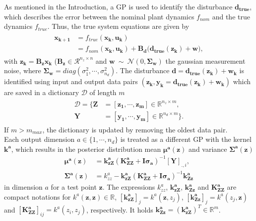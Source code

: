 \documentclass[letterpaper, 10 pt, conference]{ieeeconf}  %
\newcommand{\R}{\mathbb{R}}
\begin{document}
As mentioned in the Introduction, a GP is used to identify the disturbance $\boldsymbol{d_{true}}$, which describes the error between the nominal plant dynamics $f_{nom}$ and the true dynamics $f_{true}$. Thus, the true system equations are given by
\begin{align}
\begin{split}
\boldsymbol{x_{k+1}} &= f_{true}(\boldsymbol{x_k},\boldsymbol{u_k}) \\
        &=  f_{nom}(\boldsymbol{x_k},\boldsymbol{u_k}) + \boldsymbol{B_d}\big(\boldsymbol{d_{true}}(\boldsymbol{z_k})+ \boldsymbol{w}\big),
\end{split}
\end{align}
with $\boldsymbol{z_k} = \boldsymbol{B_z} \boldsymbol{x_k}$ ($\boldsymbol{B_z} \in \mathcal{R}^{n_z \times n}$ and $\boldsymbol{w}~\sim~\mathcal{N}(0,\boldsymbol{\Sigma_w})$  the gaussian measurement noise, where $\boldsymbol{\Sigma_w}= diag(\sigma_1^2, \cdots ,\sigma_{n_d}^2)$.
The disturbance $\boldsymbol{d} = \boldsymbol{d_{true}}(\boldsymbol{z_k}) + \boldsymbol{w_k}$ is identified using input and output data pairs $(\boldsymbol{z_k},\boldsymbol{y_k}=\boldsymbol{d_{true}}(\boldsymbol{z_k})+\boldsymbol{w_k})$ which are saved in a dictionary $\mathcal{D}$ of length $m$
\begin{align}
\begin{split}
\mathcal{D} = \{\boldsymbol{Z} &=[\boldsymbol{z_1}, \cdots, 		\boldsymbol{z_m}] \in \R^{n_z \times m} , \\
                \boldsymbol{Y} &=[\boldsymbol{y_{1}},\cdots,\boldsymbol{y_{m}}]\in \R^{n_d \times m} \}.
\end{split}
\end{align}
If $m>m_{max}$, the dictionary is updated by removing the oldest data pair.\\
Each output dimension $a \in \{1, \cdots, n_d\}$ is treated as a different GP with the kernel $\boldsymbol{k^a}$, which results in the posterior distribution mean $\boldsymbol{\mu^a(z)}$ and variance $\boldsymbol{\Sigma^a(z)}$
\begin{align}
\boldsymbol{\mu^a(z)} &= \boldsymbol{k_{zZ}^a}( \boldsymbol{K_{ZZ}^a} +\boldsymbol{I} \boldsymbol{\sigma_a})^{-1}[\boldsymbol{Y}]_{.,i},\\
\boldsymbol{\Sigma^a(z)} &= k_{zz}^a-\boldsymbol{k_{zZ}^a} ( \boldsymbol{K_{ZZ}^a} +\boldsymbol{I} \boldsymbol{\sigma_a})^{-1} \boldsymbol{k_{Zz}^a}
\end{align}
in dimension $a$ for a test point $\boldsymbol{z}$.
The expressions $k_{zz}^a$, $ \boldsymbol{k_{zZ}^a}$, $\boldsymbol{k_{Zz}^a}$ and $\boldsymbol{K_{ZZ}^a}$ are compact notations for $k^a(\boldsymbol{z},\boldsymbol{z}) \in \R$, $[\boldsymbol{k_{zZ}^a}]_j =k^a(\boldsymbol{z},z_j)$, $[\boldsymbol{k_{Zz}^a}]_j =k^a(z_j,\boldsymbol{z})$ and $[\boldsymbol{K_{ZZ}^a}]_{ij} = k^a(z_i,z_j)$, respectively. It holds $\boldsymbol{k_{Zz}^a}=(\boldsymbol{k_{zZ}^a})^T \in \R^m$.\\
\end{document}
